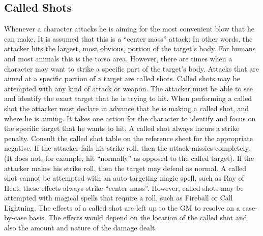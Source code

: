 \documentclass[twoside]{book}
\begin{document}
\subsection{Called Shots}
      Whenever a character attacks he is aiming for the
               most convenient blow that he can make. It is assumed that
               this is a “center mass” attack: In other
               words, the attacker hits the largest, most obvious,
               portion of the target’s body. For humans and most
               animals this is the torso area.   However, there are times when a character may want
               to strike a specific part of the target’s body.
               Attacks that are aimed at a specific portion of a target
               are called shots. Called shots may be attempted with any
               kind of attack or weapon. The attacker must be able to see
               and identify the exact target that he is trying to hit.
                 When performing a called shot the attacker must
               declare in advance that he is making a called shot, and
               where he is aiming. It takes one action for the character
               to identify and focus on the specific target that he wants
               to hit. A called shot always incurs a strike penalty.
               Consult the called shot table on the reference sheet for
               the appropriate negative. If the attacker fails his strike
               roll, then the attack missies completely. (It does not,
               for example, hit “normally” as opposed to the
               called target). If the attacker makes his strike roll,
               then the target may defend as normal.   A called shot cannot be attempted with an
               auto-targeting magic spell, such as Ray of Heat; these
               effects always strike “center mass”. However,
               called shots may be attempted with magical spells that
               require a roll, such as Fireball or Call Lightning.
                 The effects of a called shot are left up to the GM
               to resolve on a case-by-case basis. The effects would
               depend on the location of the called shot and also the
               amount and nature of the damage dealt. 
  
\end{document}
